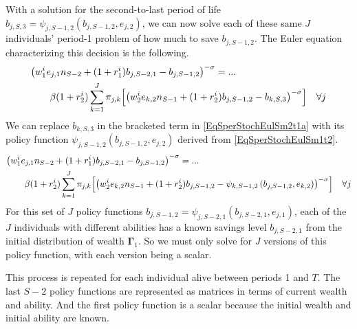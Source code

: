 \documentclass[letterpaper,12pt]{article}
\theoremstyle{definition}
\numberwithin{equation}{section}
\numberwithin{exercise}{section}
\begin{document}
\begin{spacing}{1.5}
      With a solution for the second-to-last period of life $b_{j,S,3}=\psi_{j,S-1,2}\left(b_{j,S-1,2},e_{j,2}\right)$, we can now solve each of these same $J$ individuals' period-1 problem of how much to save $b_{j,S-1,2}$. The Euler equation characterizing this decision is the following.
      \begin{equation}\label{EqSperStochEulSm2t1a}
         \begin{split}
            &\bigl(w_1^{i}e_{j,1}n_{S-2} + (1+r_1^i)b_{j,S-2,1} - b_{j,S-1,2}\bigr)^{-\sigma} = ... \\
            &\qquad \beta (1+r_2^i)\sum_{k=1}^J\pi_{j,k}\Bigl[\bigl(w_2^{i}e_{k,2}n_{S-1} + (1+r_2^i)b_{j,S-1,2} - b_{k,S,3}\bigr)^{-\sigma}\Bigr] \quad\forall j
         \end{split}
      \end{equation}
      We can replace $b_{k,S,3}$ in the bracketed term in \eqref{EqSperStochEulSm2t1a} with its policy function $\psi_{j,S-1,2}\left(b_{j,S-1,2},e_{j,2}\right)$ derived from \eqref{EqSperStochEulSm1t2}.
      \begin{equation}\label{EqSperStochEulSm2t1b}
         \begin{split}
            &\bigl(w_1^{i}e_{j,1}n_{S-2} + (1+r_1^i)b_{j,S-2,1} - b_{j,S-1,2}\bigr)^{-\sigma} = ... \\
            &\qquad \beta (1+r_2^i)\sum_{k=1}^J\pi_{j,k}\Bigl[\bigl(w_2^{i}e_{k,2}n_{S-1} + (1+r_2^i)b_{j,S-1,2} - \psi_{k,S-1,2}\left(b_{j,S-1,2},e_{k,2}\right)\bigr)^{-\sigma}\Bigr] \quad\forall j
         \end{split}
      \end{equation}
      For this set of $J$ policy functions $b_{j,S-1,2}=\psi_{j,S-2,1}\left(b_{j,S-2,1},e_{j,1}\right)$, each of the $J$ individuals with different abilities has a known savings level $b_{j,S-2,1}$ from the initial distribution of wealth $\bm{\Gamma}_1$. So we must only solve for $J$ versions of this policy function, with each version being a scalar.

      This process is repeated for each individual alive between periods 1 and $T$. The last $S-2$ policy functions are represented as matrices in terms of current wealth and ability. And the first policy function is a scalar because the initial wealth and initial ability are known.





\end{spacing}
\end{document}

